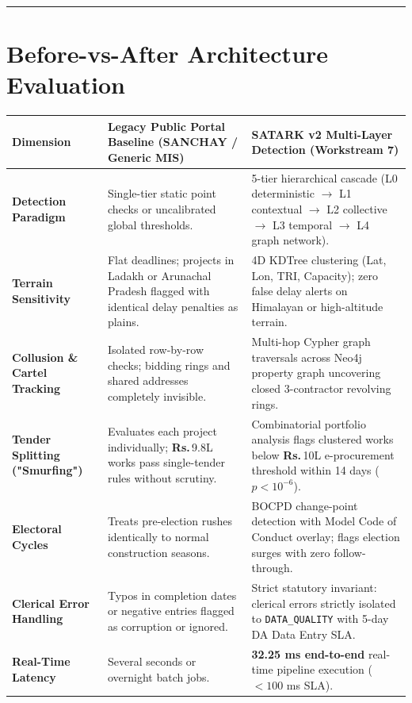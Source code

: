 \documentclass[11pt,a4paper]{article}
\DeclareRobustCommand{\INR}{\textbf{Rs.\,}}
\DeclareRobustCommand{\INR}{₹}
\begin{document}
\vspace{1em}\hrule\vspace{1em}

\section{Before-vs-After Architecture Evaluation}

\begin{table}[htbp]
\centering
\small
\begin{tabularx}{\textwidth}{l l Y}
\toprule
\textbf{Dimension} & \textbf{Legacy Public Portal Baseline (SANCHAY / Generic MIS)} & \textbf{SATARK v2 Multi-Layer Detection (Workstream 7)} \\
\midrule
\textbf{Detection Paradigm} & Single-tier static point checks or uncalibrated global thresholds. & 5-tier hierarchical cascade (L0 deterministic $\to$ L1 contextual $\to$ L2 collective $\to$ L3 temporal $\to$ L4 graph network). \\
\textbf{Terrain Sensitivity} & Flat deadlines; projects in Ladakh or Arunachal Pradesh flagged with identical delay penalties as plains. & 4D KDTree clustering (Lat, Lon, TRI, Capacity); zero false delay alerts on Himalayan or high-altitude terrain. \\
\textbf{Collusion \& Cartel Tracking} & Isolated row-by-row checks; bidding rings and shared addresses completely invisible. & Multi-hop Cypher graph traversals across Neo4j property graph uncovering closed 3-contractor revolving rings. \\
\textbf{Tender Splitting ("Smurfing")} & Evaluates each project individually; \INR{}9.8L works pass single-tender rules without scrutiny. & Combinatorial portfolio analysis flags clustered works below \INR{}10L e-procurement threshold within 14 days ($p < 10^{-6}$). \\
\textbf{Electoral Cycles} & Treats pre-election rushes identically to normal construction seasons. & BOCPD change-point detection with Model Code of Conduct overlay; flags election surges with zero follow-through. \\
\textbf{Clerical Error Handling} & Typos in completion dates or negative entries flagged as corruption or ignored. & Strict statutory invariant: clerical errors strictly isolated to \texttt{DATA\_QUALITY} with 5-day DA Data Entry SLA. \\
\textbf{Real-Time Latency} & Several seconds or overnight batch jobs. & \textbf{32.25 ms end-to-end} real-time pipeline execution ($< 100$ ms SLA). \\
\bottomrule
\end{tabularx}
\end{table}
\end{document}
